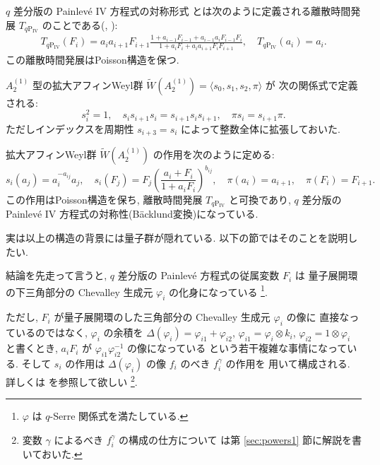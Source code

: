 \documentclass[12pt,twoside,dvipdfm]{msjproc}
\theoremstyle{definition} %
\theoremstyle{definition} %
\theoremstyle{definition} %
\numberwithin{theorem}{section}
\numberwithin{equation}{section}
\numberwithin{figure}{section}
\numberwithin{table}{section}
\newcommand\secref[1]{第 \ref{#1} 節}
\newcommand\qP[1]{{\text{$q\mathrm{P}_{\text{#1}}$}}}
\newcommand\bra{\langle}
\newcommand\ket{\rangle}
\newcommand\WW{\widetilde{W}}
\begin{document}
$q$ 差分版の Painlev\'e IV 方程式の対称形式 \qP{IV} 
とは次のように定義される離散時間発展 $T_\qP{IV}$ のことである(\cite{KNY-qPIV}, \cite{Noumi-AWG}):
\begin{align*}
  T_\qP{IV}(F_i) = 
  a_i a_{i+1} F_{i+1}
  \frac{1+a_{i-1}F_{i-1}+a_{i-1}a_i F_{i-1}F_i}{1+a_i F_i+a_i a_{i+1} F_i F_{i+1}},
  \quad
  T_\qP{IV}(a_i) = a_i.
\end{align*}
この離散時間発展はPoisson構造を保つ.

$A^{(1)}_2$ 型の拡大アフィンWeyl群 $\WW(A^{(1)}_2)=\bra s_0,s_1,s_2,\pi\ket$ が
次の関係式で定義される:
\begin{equation*}
 s_i^2=1, \quad
 s_is_{i+1}s_i=s_{i+1}s_is_{i+1}, \quad
 \pi s_i = s_{i+1} \pi.
\end{equation*}
ただしインデックスを周期性 $s_{i+3}=s_i$ によって整数全体に拡張しておいた.

拡大アフィンWeyl群 $\WW(A^{(1)}_2)$ の作用を次のように定める:
\begin{equation*}
  s_i(a_j) = a_i^{-{a_{ij}}}a_j,  \quad 
  s_i(F_j) = F_j \left(\frac{a_i+F_i}{1+a_i F_i}\right)^{b_{ij}}, \quad
  \pi(a_i)=a_{i+1}, \quad
  \pi(F_i)=F_{i+1}.
\end{equation*}
この作用はPoisson構造を保ち, 離散時間発展 $T_{\qP{IV}}$ と可換であり, 
$q$ 差分版の Painlev\'e IV 方程式の対称性(B\"acklund変換)になっている.

実は以上の構造の背景には量子群が隠れている.
以下の節ではそのことを説明したい.

結論を先走って言うと, $q$ 差分版の Painlev\'e 方程式の従属変数 $F_i$ は
量子展開環の下三角部分の Chevalley 生成元 $\varphi_i$ の化身になっている%
\footnote{$\varphi$ は $q$-Serre 関係式を満たしている.}.

ただし,  $F_i$ が量子展開環のした三角部分の Chevalley 生成元 $\varphi_i$ の像に
直接なっているのではなく, 
$\varphi_i$ の余積を $\Delta(\varphi_i)=\varphi_{i1}+\varphi_{i2}$, 
$\varphi_{i1}=\varphi_i\otimes k_i$, $\varphi_{i2}=1\otimes\varphi_i$ 
と書くとき,  $a_i F_i$ が $\varphi_{i1}\varphi_{i2}^{-1}$ の像になっている
という若干複雑な事情になっている.
そして $s_i$ の作用は $\Delta(\varphi_i)$ の像 $f_i$ のべき $f_i^\gamma$ の作用を
用いて構成される.   詳しくは \cite{Kuroki-W} を参照して欲しい%
\footnote{変数 $\gamma$ によるべき $f_i^\gamma$ の構成の仕方について
は\secref{sec:powers1}に解説を書いておいた.}. 
\end{document}
